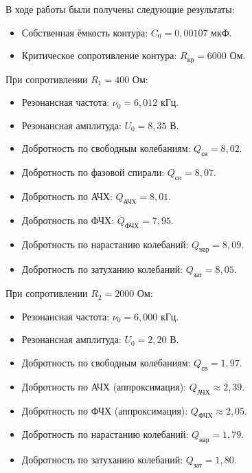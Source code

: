 \documentclass[a4paper,14pt]{extarticle}
\begin{document}
В ходе работы были получены следующие результаты:

\begin{itemize}
    \item Собственная ёмкость контура:
    $C_0 = 0{,}00107$ мкФ.

    \item Критическое сопротивление контура:
    $R_{\text{кр}} = 6000$ Ом.
\end{itemize}

При сопротивлении $R_1 = 400$ Ом:

\begin{itemize}
    \item Резонансная частота:
    $\nu_0 = 6{,}012$ кГц.

    \item Резонансная амплитуда:
    $U_0 = 8{,}35$ В.

    \item Добротность по свободным колебаниям:
    $Q_{\text{св}} = 8{,}02$.

    \item Добротность по фазовой спирали:
    $Q_{\text{сп}} = 8{,}07$.

    \item Добротность по АЧХ:
    $Q_{\text{АЧХ}} = 8{,}01$.

    \item Добротность по ФЧХ:
    $Q_{\text{ФЧХ}} = 7{,}95$.

    \item Добротность по нарастанию колебаний:
    $Q_{\text{нар}} = 8{,}09$.

    \item Добротность по затуханию колебаний:
    $Q_{\text{зат}} = 8{,}05$.
\end{itemize}

При сопротивлении $R_2 = 2000$ Ом:

\begin{itemize}
    \item Резонансная частота:
    $\nu_0 = 6{,}000$ кГц.

    \item Резонансная амплитуда:
    $U_0 = 2{,}20$ В.

    \item Добротность по свободным колебаниям:
    $Q_{\text{св}} = 1{,}97$.

    \item Добротность по АЧХ (аппроксимация):
    $Q_{\text{АЧХ}} \approx 2{,}39$.

    \item Добротность по ФЧХ (аппроксимация):
    $Q_{\text{ФЧХ}} \approx 2{,}05$.

    \item Добротность по нарастанию колебаний:
    $Q_{\text{нар}} = 1{,}79$.

    \item Добротность по затуханию колебаний:
    $Q_{\text{зат}} = 1{,}80$.
\end{itemize}
\end{document}
